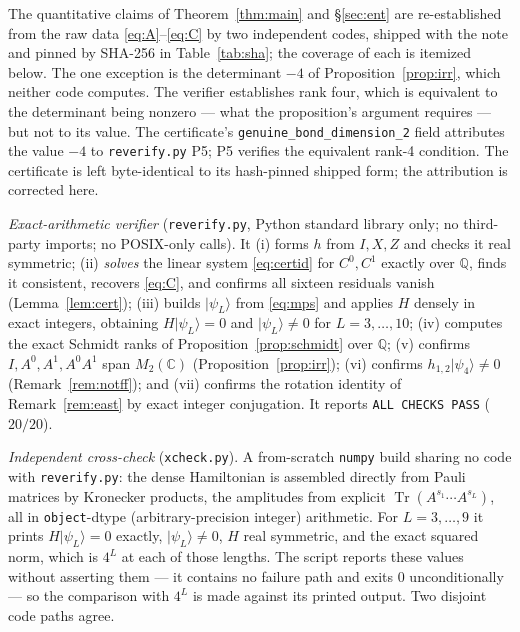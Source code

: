 \documentclass[11pt]{amsart}
\newcommand{\Tr}{\operatorname{Tr}}
\newcommand{\ket}[1]{\lvert #1 \rangle}
\newcommand{\Mtwo}{M_2(\mathbb{C})}
\newcommand{\psiL}{\ket{\psi_L}}
\theoremstyle{plain}
\theoremstyle{definition}
\theoremstyle{remark}
\begin{document}
The quantitative claims of Theorem~\ref{thm:main} and \S\ref{sec:ent} are
re-established from the raw data \eqref{eq:A}--\eqref{eq:C} by two
independent codes, shipped with the note and pinned by SHA-256 in
Table~\ref{tab:sha}; the coverage of each is itemized below. The one
exception is the determinant $-4$ of Proposition~\ref{prop:irr}, which
neither code computes. The verifier establishes rank four, which is
equivalent to the determinant being nonzero --- what the proposition's
argument requires --- but not to its value. The certificate's \texttt{genuine\_bond\_dimension\_2} field attributes the value $-4$ to \texttt{reverify.py} P5; P5 verifies the equivalent rank-4 condition. The certificate is left byte-identical to its hash-pinned shipped form; the attribution is corrected here.

\emph{Exact-arithmetic verifier} (\texttt{reverify.py}, Python standard
library only; no third-party imports; no POSIX-only calls). It (i) forms
$h$ from $I,X,Z$ and checks it real symmetric; (ii) \emph{solves} the linear
system \eqref{eq:certid} for $C^0,C^1$ exactly over $\mathbb{Q}$, finds it
consistent, recovers \eqref{eq:C}, and confirms all sixteen residuals
vanish (Lemma~\ref{lem:cert}); (iii) builds $\psiL$ from
\eqref{eq:mps} and applies $H$ densely in exact integers, obtaining
$H\psiL=0$ and $\psiL\neq0$ for $L=3,\dots,10$; (iv) computes the exact
Schmidt ranks of Proposition~\ref{prop:schmidt} over $\mathbb{Q}$;
(v) confirms $I,A^0,A^1,A^0A^1$ span $\Mtwo$ (Proposition~\ref{prop:irr});
(vi) confirms $h_{1,2}\ket{\psi_4}\neq0$ (Remark~\ref{rem:notff}); and
(vii) confirms the rotation identity of Remark~\ref{rem:east} by exact
integer conjugation. It reports \texttt{ALL CHECKS PASS} ($20/20$).

\emph{Independent cross-check} (\texttt{xcheck.py}). A from-scratch
\texttt{numpy} build sharing no code with \texttt{reverify.py}: the dense
Hamiltonian is assembled directly from Pauli matrices by Kronecker products,
the amplitudes from explicit $\Tr(A^{s_1}\cdots A^{s_L})$, all in
\texttt{object}-dtype (arbitrary-precision integer) arithmetic. For
$L=3,\dots,9$ it prints $H\psiL=0$ exactly, $\psiL\neq0$, $H$ real
symmetric, and the exact squared norm, which is $4^L$ at each of those
lengths. The script reports these values without asserting them --- it
contains no failure path and exits $0$ unconditionally --- so the comparison
with $4^L$ is made against its printed output. Two disjoint code paths
agree.
\end{document}
